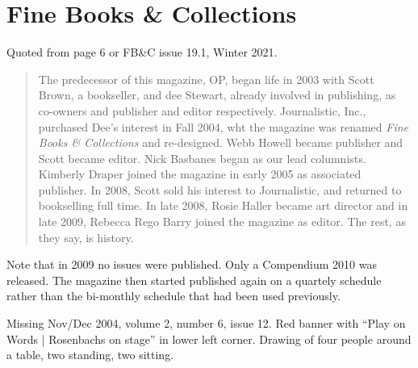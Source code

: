 \section{Fine Books \& Collections}

Quoted from page 6 or FB\&C issue 19.1, Winter 2021.

\begin{quote}
  The predecessor of this magazine, OP, began life in 2003 with Scott
  Brown, a bookseller, and dee Stewart, already involved in
  publishing, as co-owners and publisher and editor
  respectively. Journalistic, Inc., purchased Dee's interest in Fall
  2004, wht the magazine was renamed {\it Fine Books \& Collections}
  and re-designed. Webb Howell became publisher and Scott became
  editor. Nick Basbanes began as our lead columnists. Kimberly Draper
  joined the magazine in early 2005 as associated publisher. In 2008,
  Scott sold his interest to Journalistic, and returned to bookselling
  full time. In late 2008, Rosie Haller became art director and in
  late 2009, Rebecca Rego Barry joined the magazine as editor. The
  rest, as they say, is history.
\end{quote}

Note that in 2009 no issues were published.  Only a Compendium 2010
was released.  The magazine then started published again on a quartely
schedule rather than the bi-monthly schedule that had been used
previously.

Missing Nov/Dec 2004, volume 2, number 6, issue 12. Red banner with
``Play on Words | Rosenbachs on stage'' in lower left corner. Drawing
of four people around a table, two standing, two sitting.
